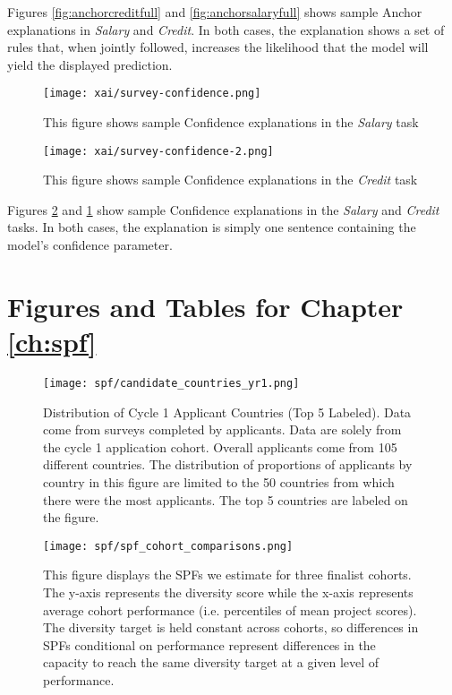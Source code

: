 Figures \ref{fig:anchorcreditfull} and \ref{fig:anchorsalaryfull} shows sample Anchor explanations in \emph{Salary} and \emph{Credit}. In both cases, the explanation shows a set of rules that, when jointly followed, increases the likelihood that the model will yield the displayed prediction.

\begin{figure}[htbp]
    \centering
    \texttt{[image: xai/survey-confidence.png]}
    \caption{This figure shows sample Confidence explanations in the \emph{Salary} task}
    \label{fig:confidencesalaryfull}
\end{figure}

\begin{figure}[hbtp]
    \centering
    \texttt{[image: xai/survey-confidence-2.png]}
    \caption{This figure shows sample Confidence explanations in the \emph{Credit} task}
    \label{fig:confidencecreditfull}
\end{figure}

Figures \ref{fig:confidencecreditfull} and \ref{fig:confidencesalaryfull} show sample Confidence explanations in the \emph{Salary} and \emph{Credit} tasks. In both cases, the explanation is simply one sentence containing the model's confidence parameter.


\section{Figures and Tables for Chapter \ref{ch:spf}}

    \begin{figure}[!htb]
    \centering
        \caption{Distribution of Cycle 1 Applicant Countries (Top 5 Labeled). Data come from surveys completed by applicants. Data are solely from the cycle 1 application cohort. Overall applicants come from 105 different countries. The distribution of proportions of applicants by country in this figure are limited to the 50 countries from which there were the most applicants. The top 5 countries are labeled on the figure. }\label{fig:dist_countryies_c1}
      \texttt{[image: spf/candidate\_countries\_yr1.png]} 
    \end{figure}
    
    
    \newpage
    \begin{figure}[!htb]
    \centering
        \caption{ This figure displays the SPFs we estimate for three finalist cohorts. The y-axis represents the diversity score while the x-axis represents average cohort performance (i.e. percentiles of mean project scores). The diversity target is held constant across cohorts, so differences in SPFs conditional on performance represent differences in the capacity to reach the same diversity target at a given level of performance.}\label{fig:diversity_across_cohorts}
      \texttt{[image: spf/spf\_cohort\_comparisons.png]} 
    \end{figure}
    
